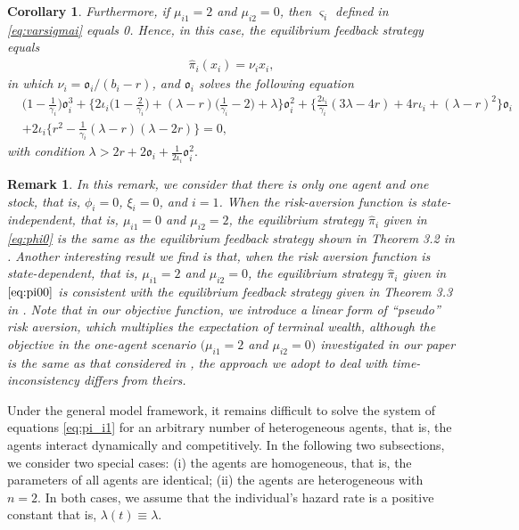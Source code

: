 \documentclass[11pt]{article}
\newtheorem{corollary}{Corollary}[section]
\newtheorem{remark}{Remark}[section]
\newcommand \la {\lambda}
\numberwithin{equation}{section}
\begin{document}
\begin{corollary}
		
		Furthermore,  if \(\mu_{i1}= 2\) and $\mu_{i2}=0$, then \(\varsigma_i\) defined in \eqref{eq:varsigmai} equals 0. Hence, in this case, the equilibrium  feedback  strategy equals
		\begin{align}\label{eq:pi00}
			\widehat{\pi}_{i}(x_i)=\nu_ix_i,
		\end{align}
		in which \(\nu_i=\mathfrak{o}_i/(b_i-r)\), and \(\mathfrak{o}_i\) solves the following equation
		\begin{align}
			&\bigg(1-\frac{1}{\gamma_i}\bigg)\mathfrak{o}_i^3+\bigg\{2\iota_i\bigg(1-\frac{2}{\gamma_i}\bigg)+(\lambda-r)\bigg(\frac{1}{\gamma_i}-
			2\bigg)+\lambda\bigg\}\mathfrak{o}_i^2+\bigg\{\frac{2\iota_i}{\gamma_i}(3\lambda-4r)+4r\iota_i+(\lambda-r)^2\bigg\}\mathfrak{o}_i\\
			&+2\iota_i\bigg\{ r^2-\frac{1}{\gamma_i}(\lambda-r)(\lambda-2r)\bigg\}=0,
		\end{align}
		with condition
		$\lambda>2r+2\mathfrak{o}_i+\frac{1}{2\iota_i}\mathfrak{o}_i^2.$
		
	\end{corollary}
	
	\begin{remark}
		In this remark, we consider that there is only one agent and one stock, that is, \(\phi_i = 0\), \(\xi_i = 0\), and \(i = 1\). When the risk-aversion function is state-independent, that is, \(\mu_{i1}=0\) and \(\mu_{i2}=2\), the equilibrium strategy \(\widehat{\pi}_i\) given in \eqref{eq:phi0} is the same as the equilibrium  feedback  strategy shown in Theorem 3.2 in \citet{landriault2018equilibrium}. Another interesting result we find is that, when the risk aversion function is state-dependent, that is, \(\mu_{i1}=2\) and \(\mu_{i2}=0\), the equilibrium strategy \(\widehat{\pi}_i\) given in \(\eqref{eq:pi00}\) is consistent with the equilibrium  feedback  strategy given in Theorem 3.3 in \citet{landriault2018equilibrium}. Note that in our objective function, we introduce a linear form of ``pseudo'' risk aversion, which multiplies the expectation of terminal wealth, although the objective in the one-agent scenario \((\mu_{i1}=2\) and \(\mu_{i2}=0)\) investigated in our paper is the same as that considered in \citet{landriault2018equilibrium}, the approach we adopt to deal with time-inconsistency differs from theirs.
	\end{remark}

Under the general model framework, it remains difficult to solve the system of equations \eqref{eq:pi_i1} for an arbitrary number of heterogeneous agents, that is, the agents interact dynamically and competitively. In the following two subsections, we consider two special cases: (i) the agents are homogeneous, that is, the parameters of all agents are identical; (ii) the agents are heterogeneous with $n=2.$
In both cases, we assume that the individual's hazard rate is a positive constant that is, \(\la(t)\equiv \la\).	
\end{document}
